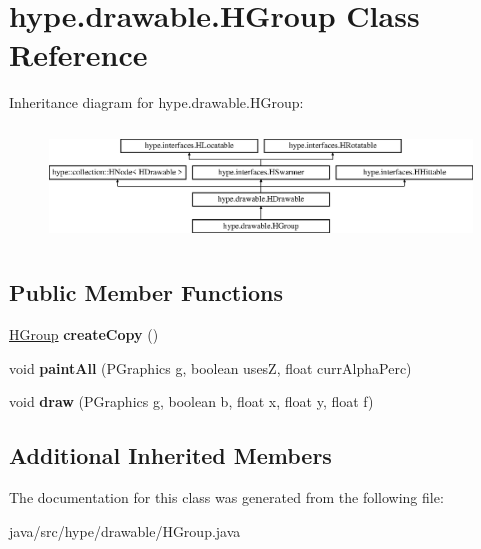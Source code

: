 \hypertarget{classhype_1_1drawable_1_1_h_group}{\section{hype.\-drawable.\-H\-Group Class Reference}
\label{classhype_1_1drawable_1_1_h_group}
}
Inheritance diagram for hype.\-drawable.\-H\-Group\-:\begin{figure}[H]
\begin{center}
\leavevmode
\includegraphics[height=3.111111cm]{classhype_1_1drawable_1_1_h_group}
\end{center}
\end{figure}
\subsection*{Public Member Functions}
\begin{DoxyCompactItemize}
\item 
\hypertarget{classhype_1_1drawable_1_1_h_group_a95a20a6436c9d906c966d21f3faf8959}{\hyperlink{classhype_1_1drawable_1_1_h_group}{H\-Group} {\bfseries create\-Copy} ()}\label{classhype_1_1drawable_1_1_h_group_a95a20a6436c9d906c966d21f3faf8959}

\item 
\hypertarget{classhype_1_1drawable_1_1_h_group_a496c3e9fdd6f0970c6dfa3ddcde363d4}{void {\bfseries paint\-All} (P\-Graphics g, boolean uses\-Z, float curr\-Alpha\-Perc)}\label{classhype_1_1drawable_1_1_h_group_a496c3e9fdd6f0970c6dfa3ddcde363d4}

\item 
\hypertarget{classhype_1_1drawable_1_1_h_group_a561903c282e77c3e43ab0f7d9e3e4ff2}{void {\bfseries draw} (P\-Graphics g, boolean b, float x, float y, float f)}\label{classhype_1_1drawable_1_1_h_group_a561903c282e77c3e43ab0f7d9e3e4ff2}

\end{DoxyCompactItemize}
\subsection*{Additional Inherited Members}


The documentation for this class was generated from the following file\-:\begin{DoxyCompactItemize}
\item 
java/src/hype/drawable/H\-Group.\-java\end{DoxyCompactItemize}
